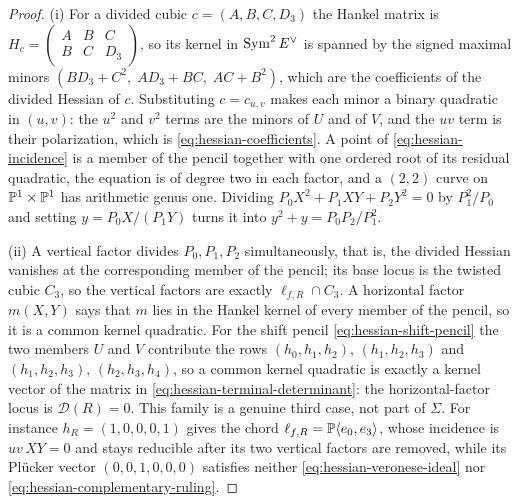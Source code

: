 \begin{proof}
(i)  For a divided cubic $c=(A,B,C,D_3)$ the Hankel matrix is
$H_c=\left(\begin{smallmatrix}A&B&C\\B&C&D_3\end{smallmatrix}\right)$, so its
kernel in $\operatorname{Sym}^2E^\vee$ is spanned by the signed maximal minors
$(BD_3+C^2,\;AD_3+BC,\;AC+B^2)$, which are the coefficients of the divided
Hessian of $c$.  Substituting $c=c_{u,v}$ makes each minor a binary quadratic
in $(u,v)$: the $u^2$ and $v^2$ terms are the minors of $U$ and of $V$, and the
$uv$ term is their polarization, which is
\eqref{eq:hessian-coefficients}.  A point of
\eqref{eq:hessian-incidence} is a member of the pencil together with one
ordered root of its residual quadratic, the equation is of degree two in each
factor, and a $(2,2)$ curve on $\mathbb P^1\times\mathbb P^1$ has arithmetic genus one.
Dividing $P_0X^2+P_1XY+P_2Y^2=0$ by $P_1^2/P_0$ and setting $y=P_0X/(P_1Y)$
turns it into $y^2+y=P_0P_2/P_1^2$.

(ii)  A vertical factor divides $P_0,P_1,P_2$ simultaneously, that is, the
divided Hessian vanishes at the corresponding member of the pencil; its base
locus is the twisted cubic $C_3$, so the vertical factors are exactly
$\ell_{f,R}\cap C_3$.  A horizontal factor $m(X,Y)$ says that $m$ lies in the
Hankel kernel of every member of the pencil, so it is a common kernel
quadratic.  For the shift pencil \eqref{eq:hessian-shift-pencil} the two
members $U$ and $V$ contribute the rows $(h_0,h_1,h_2)$, $(h_1,h_2,h_3)$ and
$(h_1,h_2,h_3)$, $(h_2,h_3,h_4)$, so a common kernel quadratic is exactly a
kernel vector of the matrix in \eqref{eq:hessian-terminal-determinant}: the
horizontal-factor locus is $\mathcal D(R)=0$.  This family is a genuine third
case, not part of $\Sigma$.  For instance $h_R=(1,0,0,0,1)$ gives the chord
$\ell_{f,R}=\mathbb P\langle e_0,e_3\rangle$, whose incidence is $uv\,XY=0$ and stays
reducible after its two vertical factors are removed, while its Pl\"ucker
vector $(0,0,1,0,0,0)$ satisfies neither
\eqref{eq:hessian-veronese-ideal} nor \eqref{eq:hessian-complementary-ruling}.


\end{proof}
